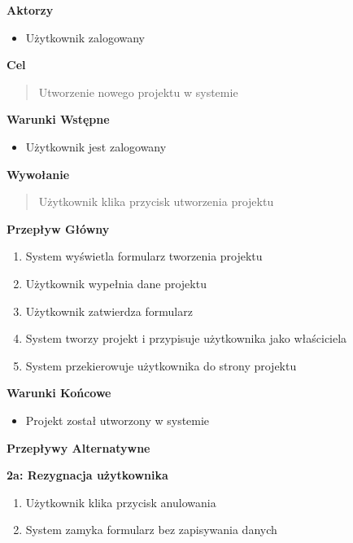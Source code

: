 \noindent\textbf{Aktorzy}
\begin{itemize}
    \item Użytkownik zalogowany
\end{itemize}

\vspace{0.2cm}
\noindent\textbf{Cel}
\begin{quote}
    Utworzenie nowego projektu w systemie
\end{quote}

\vspace{0.2cm}
\noindent\textbf{Warunki Wstępne}
\begin{itemize}
    \item Użytkownik jest zalogowany
\end{itemize}

\vspace{0.2cm}
\noindent\textbf{Wywołanie}
\begin{quote}
    Użytkownik klika przycisk utworzenia projektu
\end{quote}

\vspace{0.2cm}
\noindent\textbf{Przepływ Główny}
\begin{enumerate}
    \item System wyświetla formularz tworzenia projektu
    \item Użytkownik wypełnia dane projektu
    \item Użytkownik zatwierdza formularz
    \item System tworzy projekt i przypisuje użytkownika jako właściciela
    \item System przekierowuje użytkownika do strony projektu
\end{enumerate}

\vspace{0.2cm}
\noindent\textbf{Warunki Końcowe}
\begin{itemize}
    \item Projekt został utworzony w systemie
\end{itemize}

\vspace{0.2cm}
\noindent\textbf{Przepływy Alternatywne}

\textbf{2a: Rezygnacja użytkownika}
\begin{enumerate}
    \item Użytkownik klika przycisk anulowania
    \item System zamyka formularz bez zapisywania danych
\end{enumerate}


